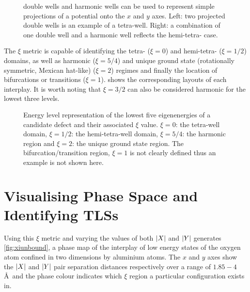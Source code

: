 \begin{figure}[htp]
\resizebox{0.8\textwidth}{!}{}
\caption[Potential Projections]{\label{fig:mexhatproj} double wells  and harmonic wells  can be used to represent simple projections of a  potential onto the $x$ and $y$ axes. Left: two projected double wells is an example of a tetra-well. Right: a combination of one double well and a harmonic well reflects the hemi-tetra- case.}
\end{figure}

The $\xi$ metric is capable of identifying the tetra- ($\xi=0$) and hemi-tetra- ($\xi=1/2$) domains, as well as harmonic ($\xi=5/4$) and unique ground state (rotationally symmetric, Mexican hat-like) ($\xi=2$) regimes and finally the location of bifurcations or transitions ($\xi=1$).
 shows the corresponding layouts of each interplay.
It is worth noting that $\xi=3/2$ can also be considered harmonic for the lowest three levels.

\begin{figure}[htp]
  \resizebox{\textwidth}{!}{}
  \caption[$\xi$ Metric]{\label{fig:ximetric}Energy level representation of the lowest five eigenenergies of a candidate defect and their associated $\xi$ value. $\xi=0$: the tetra-well domain, $\xi=1/2$: the hemi-tetra-well domain, $\xi=5/4$: the harmonic region and $\xi=2$: the unique ground state region. The bifurcation/transition region, $\xi=1$ is not clearly defined thus an example is not shown here.}
\end{figure}

\section{Visualising Phase Space and Identifying TLSs}\label{sec:phasespace}

Using this $\xi$ metric and varying the values of both $\lvert X\rvert$ and $\lvert Y\rvert$ generates \cref{fig:xiunbound}, a phase map of the interplay of low energy states of the oxygen atom confined in two dimensions by aluminium atoms.
The $x$ and $y$ axes show the $\lvert X\rvert$ and $\lvert Y\rvert$ pair separation distances respectively over a range of $1.85\!-\!4$ \AA\ and the phase colour indicates which $\xi$ region a particular configuration exists in.

